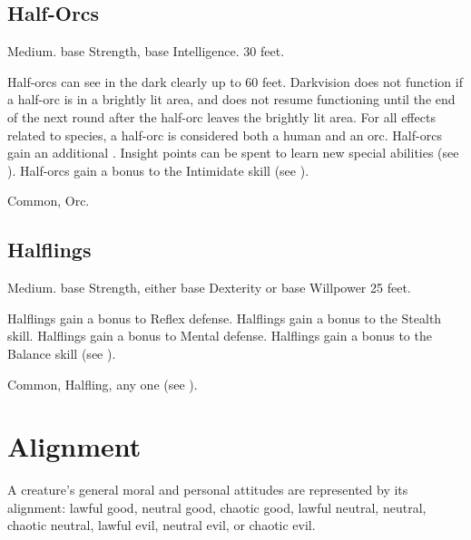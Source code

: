     \subsection{Half-Orcs}
         Medium.
          base Strength,  base Intelligence.
         30 feet.
        \begin{raggeditemize}
             Half-orcs can see in the dark clearly up to 60 feet. Darkvision does not function if a half-orc is in a brightly lit area, and does not resume functioning until the end of the next round after the half-orc leaves the brightly lit area.
             For all effects related to species, a half-orc is considered both a human and an orc.
             Half-orcs gain an additional .
                Insight points can be spent to learn new special abilities (see ).
             Half-orcs gain a  bonus to the Intimidate skill (see ).
        \end{raggeditemize}
         Common, Orc.

    \subsection{Halflings}
         Medium.
          base Strength, either  base Dexterity or  base Willpower
         25 feet.
        \begin{raggeditemize}
             Halflings gain a  bonus to Reflex defense.
             Halflings gain a  bonus to the Stealth skill.
             Halflings gain a  bonus to Mental defense.
             Halflings gain a  bonus to the Balance skill (see ).
        \end{raggeditemize}
         Common, Halfling, any one  (see ).

\section{Alignment}\label{Alignment}
    A creature's general moral and personal attitudes are represented by its alignment: lawful good, neutral good, chaotic good, lawful neutral, neutral, chaotic neutral, lawful evil, neutral evil, or chaotic evil.

